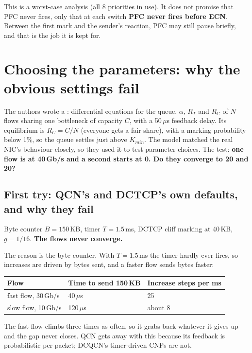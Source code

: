 This is a worst-case analysis (all 8 priorities in use). It does not promise that PFC never fires, only that at each switch \textbf{PFC never fires
before ECN}. Between the first mark and the sender's reaction, PFC may still pause briefly, and that is the job it is kept for.

\section{Choosing the parameters: why the obvious settings fail}\label{sec:dqparams}

The authors wrote a : differential equations for the queue, $\alpha$, $R_T$ and $R_C$ of $N$ flows sharing one bottleneck of capacity
$C$, with a 50\,$\mu$s feedback delay. Its equilibrium is $R_C = C/N$ (everyone gets a fair share), with a marking probability below 1\%, so the
queue settles just above $K_{min}$. The model matched the real NIC's behaviour closely, so they used it to test parameter choices. The test:
\textbf{one flow is at 40\,Gb/s and a second starts at 0. Do they converge to 20 and 20?}

\subsection{First try: QCN's and DCTCP's own defaults, and why they fail}
Byte counter $B = 150$\,KB, timer $T = 1.5$\,ms, DCTCP cliff marking at 40\,KB, $g = 1/16$. \textbf{The flows never converge.}

The reason is the byte counter. With $T = 1.5$\,ms the timer hardly ever fires, so increases are driven by bytes sent, and a faster flow sends
bytes faster:
\begin{center}
\begin{tabular}{@{}lll@{}}
\toprule
Flow & Time to send 150\,KB & Increase steps per ms\\
\midrule
fast flow, 30\,Gb/s & 40\,$\mu$s & 25\\
slow flow, 10\,Gb/s & 120\,$\mu$s & about 8\\
\bottomrule
\end{tabular}
\end{center}
The fast flow climbs three times as often, so it grabs back whatever it gives up and the gap never closes. QCN gets away with this because its
feedback is probabilistic per packet; DCQCN's timer-driven CNPs are not.

